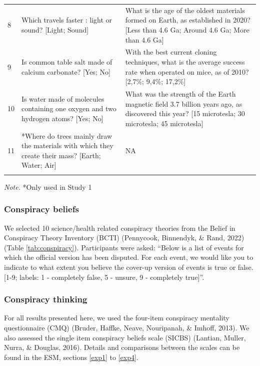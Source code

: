 \documentclass[
  doc,floatsintext]{apa6}
\begin{document}
\begin{table}[tbp]
\begin{center}
\begin{threeparttable}
\begin{tabular}{m{0.5cm}m{8cm}m{8cm}}
8 & Which travels faster : light or sound? [Light; Sound] & What is the age of the oldest materials formed on Earth, as established in 2020? [Less than 4.6 Ga; Around 4.6 Ga; More than 4.6 Ga]\\
9 & Is common table salt made of calcium carbonate? [Yes; No] & With the best current cloning techniques, what is the average success rate when operated on mice, as of 2010? [2,7\%; 9,4\%; 17,2\%]\\
10 & Is water made of molecules containing one oxygen and two hydrogen atoms? [Yes; No] & What was the strength of the Earth magnetic field 3.7 billion years ago, as discovered this year? [15 microtesla; 30 microtesla; 45 microtesla]\\
11 & *Where do trees mainly draw the materials with which they create their mass? [Earth; Water; Air] & NA\\
\bottomrule
\addlinespace
\end{tabular}

\begin{tablenotes}[para]
\normalsize{\textit{Note.} *Only used in Study 1}
\end{tablenotes}

\end{threeparttable}
\end{center}

\end{table}

\subsubsection{Conspiracy beliefs}\label{conspiracy-beliefs}

We selected 10 science/health related conspiracy theories from the Belief in Conspiracy Theory Inventory (BCTI) (Pennycook, Binnendyk, \& Rand, 2022) (Table \ref{tab:conspiracy}). Participants were asked: ``Below is a list of events for which the official version has been disputed. For each event, we would like you to indicate to what extent you believe the cover-up version of events is true or false. {[}1-9; labels: 1 - completely false, 5 - unsure, 9 - completely true{]}''.

\subsubsection{Conspiracy thinking}\label{conspiracy-thinking}

For all results presented here, we used the four-item conspiracy mentality questionnaire (CMQ) (Bruder, Haffke, Neave, Nouripanah, \& Imhoff, 2013). We also assessed the single item conspiracy beliefs scale (SICBS) (Lantian, Muller, Nurra, \& Douglas, 2016). Details and comparisons between the scales can be found in the ESM, sections \ref{exp1} to \ref{exp4}.
\end{document}
